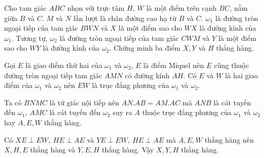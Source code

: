 \begin{prob}[IMO 2013/4]
	Cho tam giác $ABC$ nhọn với trực tâm $H$, $W$ là một điểm trên cạnh $BC$, nằm giữa $B$ và $C$. $M$ và $N$ lần lượt là chân đường cao hạ từ $B$ và $C$. $\omega_1$ là đường tròn ngoại tiếp của tam giác $BWN$ và $X$ là một điểm sao cho $WX$ là đường kính của $\omega_1$. Tương tự, $\omega_2$ là đường tròn ngoại tiếp của tam giác $CWM$ và $Y$ là một điểm sao cho $WY$ là đường kính của $\omega_2$. Chứng minh ba điểm $X, Y$ và $H$ thẳng hàng.
\end{prob}
\begin{center}

\end{center}

Gọi $E$ là giao điểm thứ hai của $\omega_1$ và $\omega_2$, $E$ là điểm Miquel nên $E$ cũng thuộc đường tròn ngoại tiếp tam giác $AMN$ có đường kính $AH$. Có $E$ và $W$ là hai giao điểm của $\omega_1$ và $\omega_2$ nên $EW$ là trục đẳng phương của $\omega_1$ và $\omega_2$.

Ta có $BNMC$ là tứ giác nội tiếp nên $AN.AB = AM.AC$ mà $ANB$ là cát tuyến đến $\omega_1$, $AMC$ là cát tuyến đến $\omega_2$ suy ra $A$ thuộc trục đẳng phương của $\omega_1$ và $\omega_2$ hay $A, E, W$ thẳng hàng.

Có $XE \perp EW,\ HE \perp AE$ và $YE \perp EW,\ HE \perp AE$ mà $A, E, W$ thẳng hàng nên $X, H, E$ thẳng hàng và $Y, E, H$ thẳng hàng. Vậy $X, Y, H$ thẳng hàng.